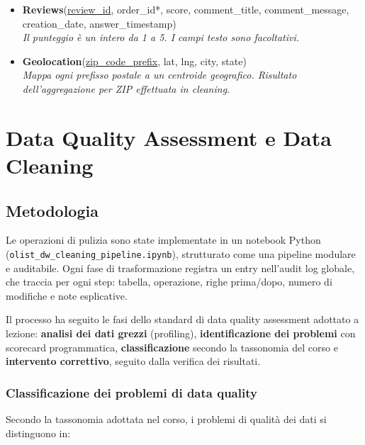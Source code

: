 \documentclass[12pt,a4paper]{article}
\begin{document}
\begin{itemize}
  \item \textbf{Reviews}(\underline{review\_id}, order\_id*, score, comment\_title,
        comment\_message, creation\_date, answer\_timestamp)\\
        \textit{Il punteggio è un intero da 1 a 5. I campi testo sono facoltativi.}

  \item \textbf{Geolocation}(\underline{zip\_code\_prefix}, lat, lng, city, state)\\
        \textit{Mappa ogni prefisso postale a un centroide geografico. Risultato
        dell'aggregazione per ZIP effettuata in cleaning.}
\end{itemize}

\section{Data Quality Assessment e Data Cleaning}

\subsection{Metodologia}

Le operazioni di pulizia sono state implementate in un notebook Python
(\texttt{olist\_dw\_cleaning\_pipeline.ipynb}), strutturato come una pipeline
modulare e auditabile. Ogni fase di trasformazione registra un entry nell'audit log
globale, che traccia per ogni step: tabella, operazione, righe prima/dopo, numero di
modifiche e note esplicative.

Il processo ha seguito le fasi dello standard di data quality assessment adottato a
lezione: \textbf{analisi dei dati grezzi} (profiling), \textbf{identificazione dei
problemi} con scorecard programmatica, \textbf{classificazione} secondo la tassonomia
del corso e \textbf{intervento correttivo}, seguito dalla verifica dei risultati.

\subsubsection*{Classificazione dei problemi di data quality}

Secondo la tassonomia adottata nel corso, i problemi di qualità dei dati si
distinguono in:
\end{document}
